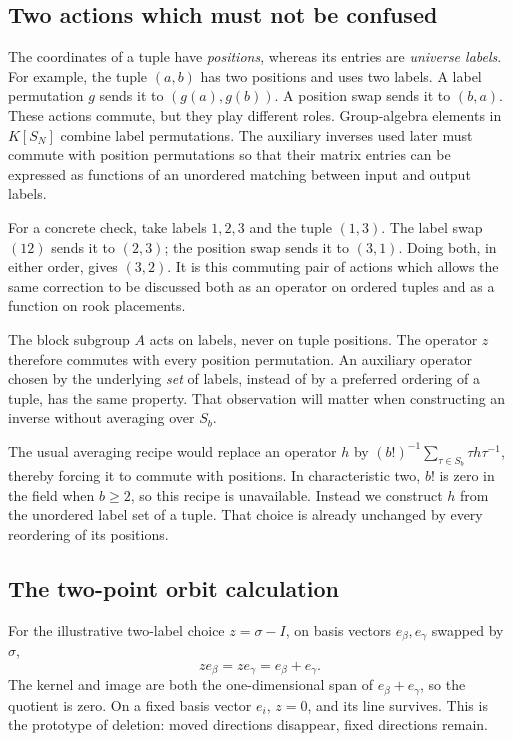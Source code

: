 \subsection{Two actions which must not be confused}
The coordinates of a tuple have \emph{positions}, whereas its entries
are \emph{universe labels}. For example, the tuple $(a,b)$ has two
positions and uses two labels. A label permutation $g$ sends it to
$(g(a),g(b))$. A position swap sends it to $(b,a)$. These actions
commute, but they play different roles. Group-algebra elements in
$K[S_N]$ combine label permutations. The auxiliary inverses used later
must commute with position permutations so that their matrix entries
can be expressed as functions of an unordered matching between input
and output labels.

For a concrete check, take labels $1,2,3$ and the tuple $(1,3)$.
The label swap $(12)$ sends it to $(2,3)$; the position swap sends
it to $(3,1)$. Doing both, in either order, gives $(3,2)$. It is
this commuting pair of actions which allows the same correction to
be discussed both as an operator on ordered tuples and as a function
on rook placements.

The block subgroup $A$ acts on labels, never on tuple positions. The
operator $z$ therefore commutes with every position permutation.
An auxiliary operator chosen by the underlying \emph{set} of labels,
instead of by a preferred ordering of a tuple, has the same property.
That observation will matter when constructing an inverse without
averaging over $S_b$.

The usual averaging recipe would replace an operator $h$ by
$(b!)^{-1}\sum_{\tau\in S_b}\tau h\tau^{-1}$, thereby forcing
it to commute with positions. In characteristic two, $b!$ is zero
in the field when $b\ge2$, so this recipe is unavailable. Instead
we construct $h$ from the unordered label set of a tuple. That
choice is already unchanged by every reordering of its positions.

\subsection{The two-point orbit calculation}
For the illustrative two-label choice $z=\sigma-I$, on basis vectors $e_\beta,e_\gamma$ swapped by $\sigma$,
\[ze_\beta=ze_\gamma=e_\beta+e_\gamma.\]
The kernel and image are both the one-dimensional span of $e_\beta+e_\gamma$, so the quotient is zero. On a fixed basis vector $e_i$, $z=0$, and its line survives. This is the prototype of deletion: moved directions disappear, fixed directions remain.

